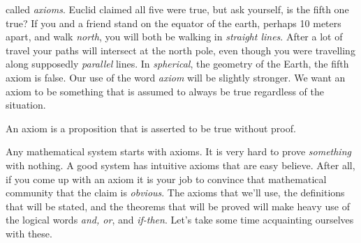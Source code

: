             called \textit{axioms}. Euclid claimed all five were true, but ask
            yourself, is the fifth one true? If you and a friend stand on the
            equator of the earth, perhaps 10 meters apart, and walk
            \textit{north}, you will both be walking in \textit{straight lines}.
            After a lot of travel your paths will intersect at the north pole,
            even though you were travelling along supposedly \textit{parallel}
            lines. In \textit{spherical}, the geometry of the Earth, the fifth
            axiom is false. Our use of the word \textit{axiom} will be slightly
            stronger. We want an axiom to be something that is assumed to
            always be true regardless of the situation.
            \begin{definition}
                An axiom is a proposition that is asserted to be true
                without proof.
            \end{definition}
            Any mathematical system starts with axioms. It is very hard to prove
            \textit{something} with nothing. A good system has intuitive axioms
            that are easy believe. After all, if you come up with an axiom it
            is your job to convince that mathematical community that the claim
            is \textit{obvious}. The axioms that we'll use, the definitions
            that will be stated, and the theorems that will be proved will make
            heavy use of the logical words \textit{and, or}, and
            \textit{if-then}. Let's take some time acquainting ourselves with
            these.
